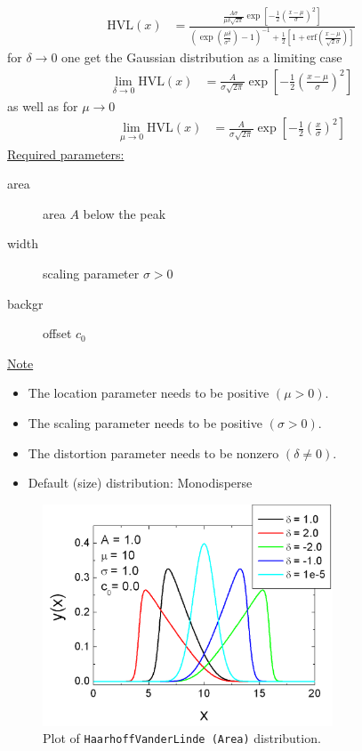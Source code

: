 \begin{align}
\textrm{HVL}(x) & =
\frac{
       \frac{A\sigma}{\mu\delta\sqrt{2\pi}}
       \exp\left[-\frac{1}{2}\left(\frac{x-\mu}{\sigma}\right)^2\right]
     }{
       \left(\exp\left(\frac{\mu\delta}{\sigma^2}\right)-1\right)^{-1}
       + \frac{1}{2}\left[1+\mathrm{erf}\left(\frac{x-\mu}{\sqrt{2}\sigma}\right)\right]
     }
\end{align}
for $\delta\rightarrow 0$ one get the Gaussian distribution as a limiting case
\begin{align}
\lim_{\delta \rightarrow 0} \textrm{HVL}(x) & =
       \frac{A}{\sigma\sqrt{2\pi}}
       \exp\left[-\frac{1}{2}\left(\frac{x-\mu}{\sigma}\right)^2\right]
\end{align}
as well as for $\mu\rightarrow 0$
\begin{align}
\lim_{\mu \rightarrow 0} \textrm{HVL}(x) & =
       \frac{A}{\sigma\sqrt{2\pi}}
       \exp\left[-\frac{1}{2}\left(\frac{x}{\sigma}\right)^2\right]
\end{align}
\uline{Required parameters:}
\begin{description}
    \item[area] area $A$ below the peak
    \item[width] scaling parameter $\sigma > 0$
    \item[backgr] offset $c_0$
\end{description}

\uline{Note}
\begin{itemize}
  \item The location parameter needs to be positive $(\mu > 0)$.
  \item The scaling parameter needs to be positive $(\sigma > 0)$.
  \item The distortion parameter needs to be nonzero $(\delta \neq 0)$.
  \item Default (size) distribution: Monodisperse
\end{itemize}

\begin{figure}[htb]
\begin{center}
\includegraphics[width=0.768\textwidth]{HaarhoffVanderLindeArea.png}
\end{center}
\caption{Plot of \texttt{HaarhoffVanderLinde (Area)} distribution.}
\label{fig:HaarhoffVanderLindeArea}
\end{figure}


